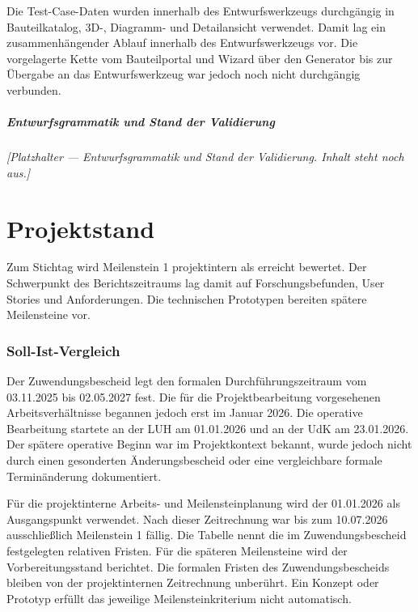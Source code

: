 \documentclass[type=zwischenbericht,theme=dark]{zukunftbau}
\begin{document}
Die Test-Case-Daten wurden innerhalb des Entwurfswerkzeugs durchgängig in Bauteilkatalog, 3D-, Diagramm- und Detailansicht verwendet. Damit lag ein zusammenhängender Ablauf innerhalb des Entwurfswerkzeugs vor. Die vorgelagerte Kette vom Bauteilportal und Wizard über den Generator bis zur Übergabe an das Entwurfswerkzeug war jedoch noch nicht durchgängig verbunden.

\subsubsection{Entwurfsgrammatik und Stand der Validierung}
\begin{Blockquote}
\textit{[Platzhalter --- Entwurfsgrammatik und Stand der Validierung. Inhalt steht noch aus.]}
\end{Blockquote}

\part{Projektstand}

Zum Stichtag wird Meilenstein 1 projektintern als erreicht bewertet. Der Schwerpunkt des Berichtszeitraums lag damit auf Forschungsbefunden, User Stories und Anforderungen. Die technischen Prototypen bereiten spätere Meilensteine vor.

\section{Soll-Ist-Vergleich}

Der Zuwendungsbescheid legt den formalen Durchführungszeitraum vom 03.11.2025 bis 02.05.2027 fest. Die für die Projektbearbeitung vorgesehenen Arbeitsverhältnisse begannen jedoch erst im Januar 2026. Die operative Bearbeitung startete an der LUH am 01.01.2026 und an der UdK am 23.01.2026. Der spätere operative Beginn war im Projektkontext bekannt, wurde jedoch nicht durch einen gesonderten Änderungsbescheid oder eine vergleichbare formale Terminänderung dokumentiert.

Für die projektinterne Arbeits- und Meilensteinplanung wird der 01.01.2026 als Ausgangspunkt verwendet. Nach dieser Zeitrechnung war bis zum 10.07.2026 ausschließlich Meilenstein 1 fällig. Die Tabelle nennt die im Zuwendungsbescheid festgelegten relativen Fristen. Für die späteren Meilensteine wird der Vorbereitungsstand berichtet. Die formalen Fristen des Zuwendungsbescheids bleiben von der projektinternen Zeitrechnung unberührt. Ein Konzept oder Prototyp erfüllt das jeweilige Meilensteinkriterium nicht automatisch.
\end{document}
